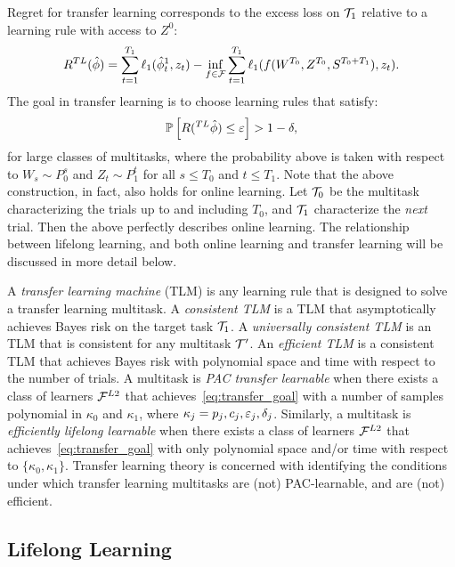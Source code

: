 \documentclass{article}
\begin{document}
Regret for transfer learning corresponds to the excess loss on $\mathcal{T}_1$ relative to a learning rule with access to $Z^0$:
\begin{align}
    R^{TL}(\hat{\phi}) = \sum_{t=1}^{T_1} \ell_1(\hat{\phi}^1_t, z_t)    - \inf_{f \in \mathcal{F}} \sum_{t=1}^{T_1} \ell_1(f(W^{T_0}, Z^{T_0}, S^{T_0+T_1}), z_t).
\end{align}
The goal in transfer learning  is to choose learning rules that satisfy:
\begin{align} \label{eq:transfer_goal}
    \mathbb{P}\left[R(^{TL}\hat{\phi})  \leq \varepsilon \right] > 1 - \delta,
\end{align}
for large classes of multitasks, 
where the probability above is taken with respect to $W_s \sim P_0^s$ and $Z_t \sim P_1^t$ for all $s \leq T_0$ and $t \leq T_1$.  Note that the above construction, in fact, also holds for online learning.  Let $\mathcal{T}_0$ be the multitask characterizing the trials up to and including $T_0$, and $\mathcal{T}_1$ characterize the \emph{next} trial.  Then the above perfectly describes online learning.  The relationship between lifelong learning, and both online learning and transfer learning will be discussed in more detail below. 

A \emph{transfer learning machine} (TLM) is any learning rule that is designed to solve a transfer learning multitask. A \emph{consistent TLM} is a TLM that asymptotically achieves Bayes risk on the target task $\mathcal{T}_1$.  
A \emph{universally consistent TLM} is an TLM that is consistent for any multitask $\mathcal{T}'$.  
An \emph{efficient TLM}  is a consistent TLM that achieves Bayes risk with polynomial space and time with respect to the number of trials. 
A multitask is \emph{PAC transfer learnable} when there exists a class of learners $\mathcal{F}^{L2}$ that achieves~\eqref{eq:transfer_goal} with a number of samples polynomial in $\kappa_0$ and $\kappa_1$, where $\kappa_j=p_j,c_j,\varepsilon_j,\delta_j$.  Similarly, a multitask is \emph{efficiently lifelong learnable} when there exists a class of learners $\mathcal{F}^{L2}$ that achieves~\eqref{eq:transfer_goal} with only polynomial space and/or time with respect to $\{\kappa_0, \kappa_1\}$.
{Transfer learning theory is concerned with identifying the conditions under which transfer learning multitasks are (not) PAC-learnable, and are (not) efficient.}



\subsection{Lifelong Learning}
\end{document}

